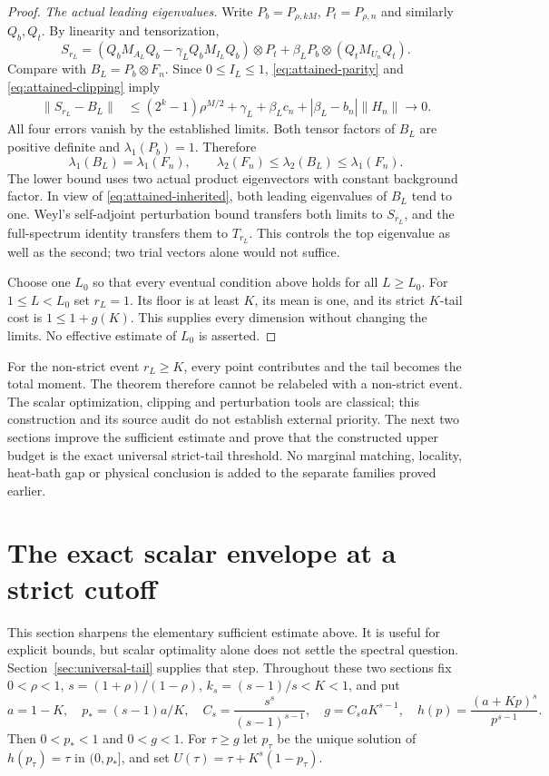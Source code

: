 \documentclass[11pt]{article}
\begin{document}
\begin{proof}
\emph{The actual leading eigenvalues.}
Write $P_b=P_{\rho,kM}$, $P_t=P_{\rho,n}$ and similarly $Q_b,Q_t$.
By linearity and tensorization,
\[
 S_{r_L}=(Q_bM_{A_L}Q_b-\gamma_LQ_bM_{I_L}Q_b)\otimes P_t
 +\beta_LP_b\otimes(Q_tM_{U_n}Q_t).
\]
Compare with $B_L=P_b\otimes F_n$. Since $0\le I_L\le1$,
\eqref{eq:attained-parity} and \eqref{eq:attained-clipping} imply
\begin{align*}
 \|S_{r_L}-B_L\|
 &\le(2^k-1)\rho^{M/2}+\gamma_L
       +\beta_Lc_n+|\beta_L-b_n|\|H_n\|\longrightarrow0.
\end{align*}
All four errors vanish by the established limits.
Both tensor factors of $B_L$ are positive definite and
$\lambda_1(P_b)=1$. Therefore
\[
 \lambda_1(B_L)=\lambda_1(F_n),\qquad
 \lambda_2(F_n)\le\lambda_2(B_L)\le\lambda_1(F_n).
\]
The lower bound uses two actual product eigenvectors with constant
background factor. In view of \eqref{eq:attained-inherited}, both
leading eigenvalues of $B_L$ tend to one. Weyl's self-adjoint
perturbation bound transfers both limits to $S_{r_L}$, and the
full-spectrum identity transfers them to $T_{r_L}$. This controls
the top eigenvalue as well as the second; two trial vectors alone
would not suffice.

Choose one $L_0$ so that every eventual condition above holds for
all $L\ge L_0$. For $1\le L<L_0$ set $r_L=1$. Its floor is at
least $K$, its mean is one, and its strict $K$-tail cost is
$1\le1+g(K)$. This supplies every dimension without changing the
limits. No effective estimate of $L_0$ is asserted.
\end{proof}

For the non-strict event $r_L\ge K$, every point contributes and the
tail becomes the total moment. The theorem therefore cannot be
relabeled with a non-strict event. The scalar optimization, clipping
and perturbation tools are classical; this construction and its
source audit do not establish external priority. The next two sections
improve the sufficient estimate and prove that the constructed upper
budget is the exact universal strict-tail threshold.
No marginal matching, locality, heat-bath gap or physical conclusion
is added to the separate families proved earlier.


\section{The exact scalar envelope at a strict cutoff}\label{sec:scalar-envelope}
This section sharpens the elementary sufficient estimate above. It is
useful for explicit bounds, but scalar optimality alone does not settle
the spectral question. Section~\ref{sec:universal-tail} supplies that step.
Throughout these two sections fix $0<\rho<1$, $s=(1+\rho)/(1-\rho)$,
$k_s=(s-1)/s<K<1$, and put
\[
 a=1-K,\quad p_*=(s-1)a/K,\quad C_s=\frac{s^s}{(s-1)^{s-1}},
 \quad g=C_saK^{s-1},\quad h(p)=\frac{(a+Kp)^s}{p^{s-1}}.
\]
Then $0<p_*<1$ and $0<g<1$. For $\tau\ge g$ let $p_\tau$ be the
unique solution of $h(p_\tau)=\tau$ in $(0,p_*]$, and set
$U(\tau)=\tau+K^s(1-p_\tau)$.
\end{document}
